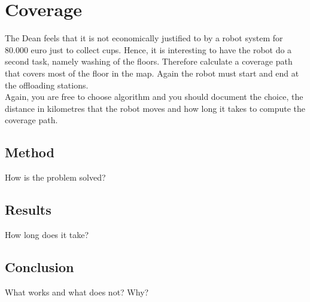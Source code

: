 \section{Coverage}
\label{sec::coverage}
The Dean feels that it is not economically justified to by a robot system for 80.000 euro just to collect cups. Hence, it is interesting to have the robot do a second task, namely washing of the floors. Therefore calculate a coverage path that covers most of the floor in the map. Again the robot must start and end at the offloading stations.\\[0.2cm]
Again, you are free to choose algorithm and you should document the choice, the distance in kilometres that the robot moves and how long it takes to compute the coverage path.

\subsection{Method}
How is the problem solved? 

\subsection{Results}
How long does it take?

\subsection{Conclusion}
What works and what does not? Why?
